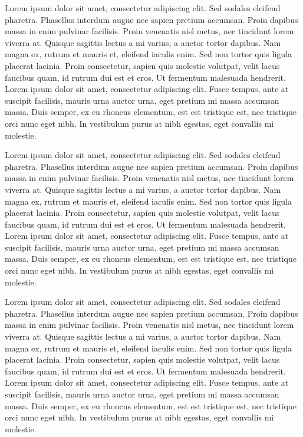 Lorem ipsum dolor sit amet, consectetur adipiscing elit. Sed sodales
eleifend pharetra. Phasellus interdum augue nec sapien pretium accumsan.
Proin dapibus massa in enim pulvinar facilisis. Proin venenatis nisl metus,
nec tincidunt lorem viverra at. Quisque sagittis lectus a mi varius, a
auctor tortor dapibus. Nam magna ex, rutrum et mauris et, eleifend iaculis
enim. Sed non tortor quis ligula placerat lacinia. Proin consectetur, sapien
quis molestie volutpat, velit lacus faucibus quam, id rutrum dui est et
eros. Ut fermentum malesuada hendrerit. Lorem ipsum dolor sit amet,
consectetur adipiscing elit. Fusce tempus, ante at suscipit facilisis,
mauris urna auctor urna, eget pretium mi massa accumsan massa. Duis semper,
ex eu rhoncus elementum, est est tristique est, nec tristique orci nunc eget
nibh. In vestibulum purus at nibh egestas, eget convallis mi molestie.

Lorem ipsum dolor sit amet, consectetur adipiscing elit. Sed sodales
eleifend pharetra. Phasellus interdum augue nec sapien pretium accumsan.
Proin dapibus massa in enim pulvinar facilisis. Proin venenatis nisl metus,
nec tincidunt lorem viverra at. Quisque sagittis lectus a mi varius, a
auctor tortor dapibus. Nam magna ex, rutrum et mauris et, eleifend iaculis
enim. Sed non tortor quis ligula placerat lacinia. Proin consectetur, sapien
quis molestie volutpat, velit lacus faucibus quam, id rutrum dui est et
eros. Ut fermentum malesuada hendrerit. Lorem ipsum dolor sit amet,
consectetur adipiscing elit. Fusce tempus, ante at suscipit facilisis,
mauris urna auctor urna, eget pretium mi massa accumsan massa. Duis semper,
ex eu rhoncus elementum, est est tristique est, nec tristique orci nunc eget
nibh. In vestibulum purus at nibh egestas, eget convallis mi molestie.

Lorem ipsum dolor sit amet, consectetur adipiscing elit. Sed sodales
eleifend pharetra. Phasellus interdum augue nec sapien pretium accumsan.
Proin dapibus massa in enim pulvinar facilisis. Proin venenatis nisl metus,
nec tincidunt lorem viverra at. Quisque sagittis lectus a mi varius, a
auctor tortor dapibus. Nam magna ex, rutrum et mauris et, eleifend iaculis
enim. Sed non tortor quis ligula placerat lacinia. Proin consectetur, sapien
quis molestie volutpat, velit lacus faucibus quam, id rutrum dui est et
eros. Ut fermentum malesuada hendrerit. Lorem ipsum dolor sit amet,
consectetur adipiscing elit. Fusce tempus, ante at suscipit facilisis,
mauris urna auctor urna, eget pretium mi massa accumsan massa. Duis semper,
ex eu rhoncus elementum, est est tristique est, nec tristique orci nunc eget
nibh. In vestibulum purus at nibh egestas, eget convallis mi molestie.

